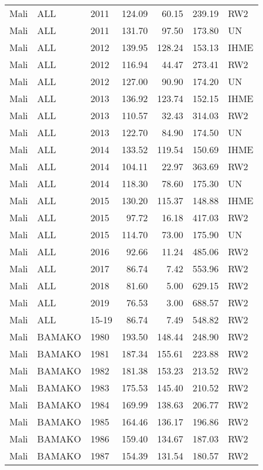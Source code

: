 \begin{longtable}{lllrrrl}
  Mali & ALL & 2011 & 124.09 & 60.15 & 239.19 & RW2 \\ 
  Mali & ALL & 2011 & 131.70 & 97.50 & 173.80 & UN \\ 
  Mali & ALL & 2012 & 139.95 & 128.24 & 153.13 & IHME \\ 
  Mali & ALL & 2012 & 116.94 & 44.47 & 273.41 & RW2 \\ 
  Mali & ALL & 2012 & 127.00 & 90.90 & 174.20 & UN \\ 
  Mali & ALL & 2013 & 136.92 & 123.74 & 152.15 & IHME \\ 
  Mali & ALL & 2013 & 110.57 & 32.43 & 314.03 & RW2 \\ 
  Mali & ALL & 2013 & 122.70 & 84.90 & 174.50 & UN \\ 
  Mali & ALL & 2014 & 133.52 & 119.54 & 150.69 & IHME \\ 
  Mali & ALL & 2014 & 104.11 & 22.97 & 363.69 & RW2 \\ 
  Mali & ALL & 2014 & 118.30 & 78.60 & 175.30 & UN \\ 
  Mali & ALL & 2015 & 130.20 & 115.37 & 148.88 & IHME \\ 
  Mali & ALL & 2015 & 97.72 & 16.18 & 417.03 & RW2 \\ 
  Mali & ALL & 2015 & 114.70 & 73.00 & 175.90 & UN \\ 
  Mali & ALL & 2016 & 92.66 & 11.24 & 485.06 & RW2 \\ 
  Mali & ALL & 2017 & 86.74 & 7.42 & 553.96 & RW2 \\ 
  Mali & ALL & 2018 & 81.60 & 5.00 & 629.15 & RW2 \\ 
  Mali & ALL & 2019 & 76.53 & 3.00 & 688.57 & RW2 \\ 
  Mali & ALL & 15-19 & 86.74 & 7.49 & 548.82 & RW2 \\ 
  Mali & BAMAKO & 1980 & 193.50 & 148.44 & 248.90 & RW2 \\ 
  Mali & BAMAKO & 1981 & 187.34 & 155.61 & 223.88 & RW2 \\ 
  Mali & BAMAKO & 1982 & 181.38 & 153.23 & 213.52 & RW2 \\ 
  Mali & BAMAKO & 1983 & 175.53 & 145.40 & 210.52 & RW2 \\ 
  Mali & BAMAKO & 1984 & 169.99 & 138.63 & 206.77 & RW2 \\ 
  Mali & BAMAKO & 1985 & 164.46 & 136.17 & 196.86 & RW2 \\ 
  Mali & BAMAKO & 1986 & 159.40 & 134.67 & 187.03 & RW2 \\ 
  Mali & BAMAKO & 1987 & 154.39 & 131.54 & 180.57 & RW2 \\ 

\end{longtable}
